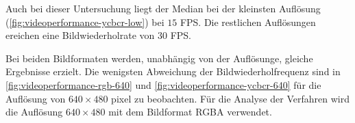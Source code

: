 Auch bei dieser Untersuchung liegt der Median bei der kleinsten Auflösung (\autoref{fig:videoperformance-ycbcr-low})
 bei $15$ FPS. Die restlichen Auflösungen ereichen eine Bildwiederholrate von $30$ FPS.

Bei beiden Bildformaten werden, unabhängig von der Auflösunge, gleiche Ergebnisse erzielt. Die wenigsten Abweichung der
 Bildwiederholfrequenz sind in \autoref{fig:videoperformance-rgb-640} und \autoref{fig:videoperformance-ycbcr-640} für die
 Auflösung von $640 \times 480$ \gls{pixel} zu beobachten. Für die Analyse der Verfahren wird die Auflösung
 $640 \times 480$ mit dem Bildformat RGBA verwendet.

